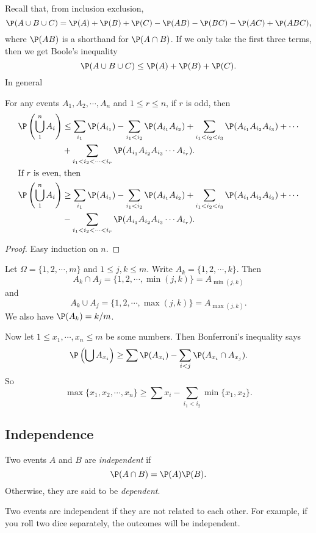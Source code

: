 \documentclass[a4paper]{article}
\begin{document}
Recall that, from inclusion exclusion,
\[
  \P(A\cup B\cup C) = \P(A) + \P(B) + \P(C) - \P(AB) - \P(BC) - \P(AC) + \P(ABC),
\]
where $\P(AB)$ is a shorthand for $\P(A\cap B)$. If we only take the first three terms, then we get Boole's inequality
\[
  \P(A\cup B\cup C) \leq \P(A) + \P(B) + \P(C).
\]
In general
\begin{thm}
  For any events $A_1, A_2, \cdots, A_n$ and $1 \leq r\leq n$, if $r$ is odd, then
  \begin{align*}
    \P\left(\bigcup_{1}^n A_i\right) &\leq \sum_{i_1} \P(A_{i_1}) - \sum_{i_1 < i_2} \P(A_{i_1}A_{i_2}) + \sum_{i_1 < i_2 < i_3} \P(A_{i_1}A_{i_2}A_{i_3}) + \cdots\\
    &+ \sum_{i_1 < i_2 < \cdots < i_r} \P(A_{i_1}A_{i_2}A_{i_3}\cdots A_{i_r}).\\
    \intertext{If $r$ is even, then}
    \P\left(\bigcup_{1}^n A_i\right) &\geq \sum_{i_1} \P(A_{i_1}) - \sum_{i_1 < i_2} \P(A_{i_1}A_{i_2}) + \sum_{i_1 < i_2 < i_3} \P(A_{i_1}A_{i_2}A_{i_3}) + \cdots\\
    &- \sum_{i_1 < i_2 < \cdots < i_r} \P(A_{i_1}A_{i_2}A_{i_3}\cdots A_{i_r}).
  \end{align*}
\end{thm}

\begin{proof}
  Easy induction on $n$.
\end{proof}

\begin{eg}
  Let $\Omega = \{1, 2, \cdots, m\}$ and $1 \leq j, k \leq m$. Write $A_k = \{1, 2, \cdots, k\}$. Then
  \[
    A_k \cap A_j = \{1, 2, \cdots, \min(j, k)\} = A_{\min(j, k)}
  \]
  and
  \[
    A_k \cup A_j = \{1, 2, \cdots, \max(j, k)\} = A_{\max(j, k)}.
  \]
  We also have $\P(A_k) = k/m$.

  Now let $1 \leq x_1, \cdots, x_n \leq m$ be some numbers. Then Bonferroni's inequality says
  \[
    \P\left(\bigcup A_{x_{i}}\right) \geq \sum \P(A_{x_i}) - \sum_{i < j} \P(A_{x_i}\cap A_{x_j}).
  \]
  So
  \[
    \max\{x_1, x_2, \cdots, x_n\} \geq \sum x_i - \sum_{i_1 < i_2} \min\{x_1, x_2\}.
  \]
\end{eg}

\subsection{Independence}
\begin{defi}
  Two events $A$ and $B$ are \emph{independent} if
  \[
    \P(A\cap B) = \P(A)\P(B).
  \]
  Otherwise, they are said to be \emph{dependent}.
\end{defi}
Two events are independent if they are not related to each other. For example, if you roll two dice separately, the outcomes will be independent.
\end{document}
